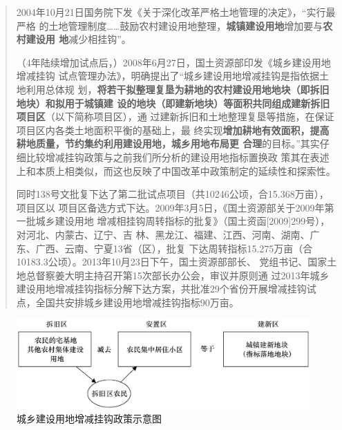 \begin{quotation}
  2004年10月21日国务院下发《关于深化改革严格土地管理的决定》，“实行最严格
  的土地管理制度……鼓励农村建设用地整理，\textbf{城镇建设用地}增加要与\textbf{农村建设用
    地}减少相挂钩”。

  （4年陆续增加试点后，）2008年6月27日，国土资源部印发《城乡建设用地增减挂钩
  试点管理办法》，明确提出了“城乡建设用地增减挂钩是指依据土地利用总体规
  划，\textbf{将若干拟整理复垦为耕地的农村建设用地地块（即拆旧地块）和拟用于城镇建
    设的地块（即建新地块）等面积共同组成建新拆旧项目区}（以下简称项目区），通
  过建新拆旧和土地整理复垦等措施，在保证项目区内各类土地面积平衡的基础上，最
  终实现\textbf{增加耕地有效面积，提高耕地质量，节约集约利用建设用地，城乡用地布局更
  合理}的目标。”其实仔细比较增减挂钩政策与之前我们所分析的建设用地指标置换政
  策其在表述上和本质上相类似，而这也反映了中国改革中政策制定的延续性和探索性。

  同时138号文批复下达了第二批试点项目（共10246公顷，合15.368万亩），项目区以
  项目区备选方式下达。2009年3月5日，《国土资源部关于2009年第一批城乡建设用地
  增减相挂钩周转指标的批复》（国土资函[2009]299号），对河北、内蒙古、辽宁、吉
  林、黑龙江、福建、江西、河南、湖南、广东、广西、云南、宁夏13省（区），批复
  下达周转指标15.275万亩（合10183.3公顷）。2013年10月23日下午，国土资源部部长、
  党组书记、国家土地总督察姜大明主持召开第15次部长办公会，审议并原则通
  过2013年城乡建设用地增减挂钩指标分解下达方案，共批准29个省份开展增减挂钩试
  点，全国共安排城乡建设用地增减挂钩指标90万亩。\cite{yangdi}
\end{quotation}

\begin{figure}[htbp!]
  \centering
  \includegraphics[width=0.9\linewidth]{figures/zengjianguagou.jpg}
  \caption{\label{fig:zengjianguagou}城乡建设用地增减挂钩政策示意图}
\end{figure}

